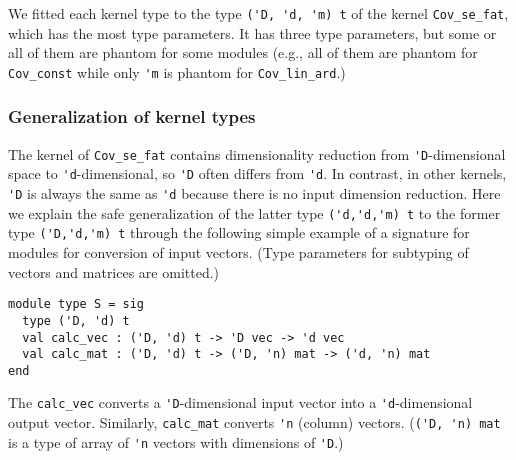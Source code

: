 \documentclass[10pt,a4paper]{article}
\begin{document}
We fitted each kernel type to the type \lstinline|('D, 'd, 'm) t| of the kernel
\lstinline|Cov_se_fat|, which has the most type parameters.
It has three type parameters, but some or all of them are phantom for some modules
(e.g., all of them are phantom for \lstinline|Cov_const| while only
\lstinline|'m| is phantom for \lstinline|Cov_lin_ard|.)

\subsubsection{Generalization of kernel types}

The kernel of \lstinline|Cov_se_fat| contains dimensionality reduction from
\lstinline|'D|-dimensional space to \lstinline|'d|-dimensional, so \lstinline|'D| often
differs from \lstinline|'d|.
In contrast, in other kernels, \lstinline|'D| is always the same as \lstinline|'d|
because there is no input dimension reduction.
Here we explain the safe generalization of the latter type
\lstinline|('d,'d,'m) t| to the former type \lstinline|('D,'d,'m) t|
through the following simple example of a signature for modules for
conversion of input vectors.
(Type parameters for subtyping of vectors and matrices are omitted.)
\begin{lstlisting}
module type S = sig
  type ('D, 'd) t
  val calc_vec : ('D, 'd) t -> 'D vec -> 'd vec
  val calc_mat : ('D, 'd) t -> ('D, 'n) mat -> ('d, 'n) mat
end
\end{lstlisting}
The \lstinline|calc_vec| converts a \lstinline|'D|-dimensional input vector into
a \lstinline|'d|-dimensional output vector.
Similarly, \lstinline|calc_mat| converts \lstinline|'n| (column) vectors.
(\lstinline|('D, 'n) mat| is a type of array of \lstinline|'n| vectors
with dimensions of \lstinline|'D|.)
\end{document}
